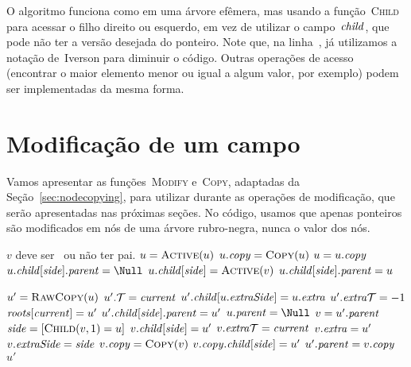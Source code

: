\documentclass[main.tex]{subfiles}
\begin{document}
O algoritmo funciona como em uma árvore efêmera, mas usando a função~\textsc{Child} para acessar o filho direito ou esquerdo, em vez de utilizar o campo~$\mathit{child}$, que pode não ter a versão desejada do ponteiro. Note que, na linha~, já utilizamos a notação de~Iverson para diminuir o código. Outras operações de acesso (encontrar o maior elemento menor ou igual a algum valor, por exemplo) podem ser implementadas da mesma forma.

\section{Modificação de um campo}

Vamos apresentar as funções~\textsc{Modify} e~\textsc{Copy}, adaptadas da Seção~\ref{sec:nodecopying}, para utilizar durante as operações de modificação, que serão apresentadas nas próximas seções. No código, usamos que apenas ponteiros são modificados em nós de uma árvore rubro-negra, nunca o valor dos nós.

\begin{algorithm}
\begin{algorithmic}[1]

\Require $v$ deve ser~ ou não ter pai.
 
	\State $u = \Call{Active}{u}$
		\State $u.\cp = \Call{Copy}{u}$
		\State $u = u.\mathit{copy}$
	\EndIf
		\State $u.\child[\side].\parent = \Null$
	\EndIf
	\State $u.\child[\side] = \Call{Active}{v}$
		\State $u.\mathit{child}[\mathit{side}].\mathit{parent} = u$
	\EndIf
\EndFunction

	\State $u' = \Call{RawCopy}{u}$
	\State $u'.\mathcal{T} = \mathit{current}$
		\State $u'.\mathit{child}[u.\mathit{extraSide}] = u.\mathit{extra}$
		\State $u'.\mathit{extra\mathcal{T}} = -1$ 
	\EndIf
		\State $\mathit{roots}[\mathit{current}] = u'$
	\EndIf
			\State $u'.\mathit{child}[\mathit{side}].\mathit{parent} = u'$
		\EndIf
	\EndFor
	\State $u.\parent = \Null$
		\State $v = u'.\mathit{parent}$
		\State $\side = [\Call{Child}{v, 1} = u]$ \label{line:copyrb:side}
			\State $v.\mathit{child}[\mathit{side}] = u'$
			\State $v.\mathit{extra\mathcal{T}} = \mathit{current}$
			\State $v.\mathit{extra} = u'$
			\State $v.\mathit{extraSide} = \mathit{side}$
		\Else
			\State $v.\cp = \Call{Copy}{v}$
			\State $v.\mathit{copy}.\mathit{child}[\mathit{side}] = u'$
			\State $u'.\mathit{parent} = v.\mathit{copy}$
		\EndIf
	\EndIf
	\State \Return $u'$
\EndFunction

\end{algorithmic}
\end{algorithm}
\end{document}
